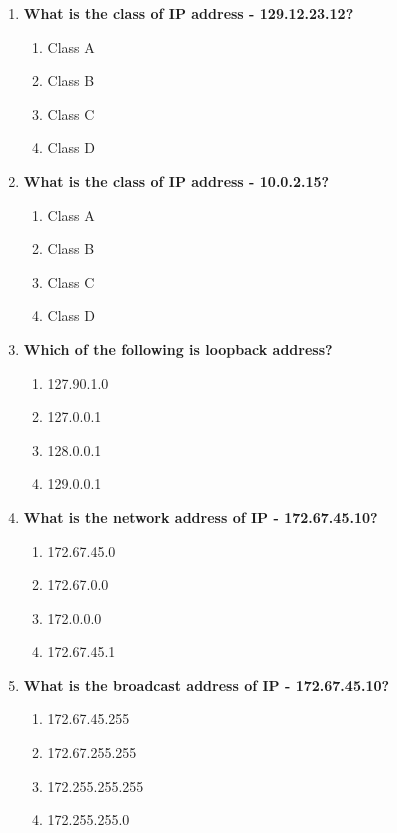 \begin{flushleft}
\begin{enumerate}
		\item \textbf{What is the class of IP address - 129.12.23.12?}
		\begin{enumerate}[label=(\alph*)]
			\item Class A
			\item Class B  %
			\item Class C  
			\item Class D
		\end{enumerate}
		\bigskip
		\bigskip

		\item \textbf{What is the class of IP address - 10.0.2.15?}
		\begin{enumerate}[label=(\alph*)]
			\item Class A  %
			\item Class B  
			\item Class C  
			\item Class D
		\end{enumerate}
		\bigskip
		\bigskip

		\item \textbf{Which of the following is loopback address?}
		\begin{enumerate}[label=(\alph*)]
			\item 127.90.1.0
			\item 127.0.0.1   %
			\item 128.0.0.1
			\item 129.0.0.1
		\end{enumerate}
		\bigskip
		\bigskip
		
		\item \textbf{What is the network address of IP - 172.67.45.10?}
		\begin{enumerate}[label=(\alph*)]
			\item 172.67.45.0
			\item 172.67.0.0 %
			\item 172.0.0.0
			\item 172.67.45.1
		\end{enumerate}
		\bigskip
		\bigskip

		\item \textbf{What is the broadcast address of IP - 172.67.45.10?}
		\begin{enumerate}[label=(\alph*)]
			\item 172.67.45.255
			\item 172.67.255.255 %
			\item 172.255.255.255
			\item 172.255.255.0
		\end{enumerate}
		\bigskip
		\bigskip		


\end{enumerate}
\end{flushleft}
